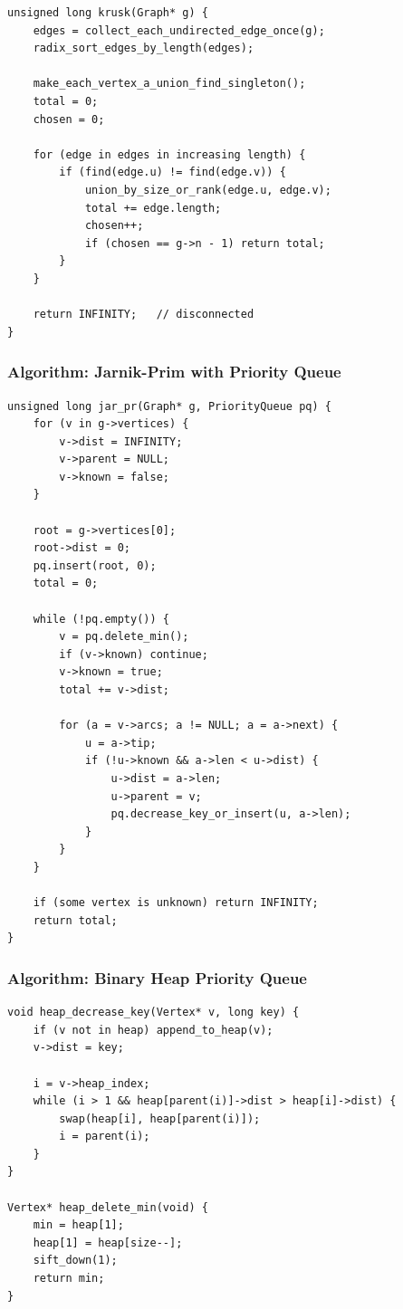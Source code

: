 \documentclass[11pt]{article}
\begin{document}
\begin{verbatim}
unsigned long krusk(Graph* g) {
    edges = collect_each_undirected_edge_once(g);
    radix_sort_edges_by_length(edges);

    make_each_vertex_a_union_find_singleton();
    total = 0;
    chosen = 0;

    for (edge in edges in increasing length) {
        if (find(edge.u) != find(edge.v)) {
            union_by_size_or_rank(edge.u, edge.v);
            total += edge.length;
            chosen++;
            if (chosen == g->n - 1) return total;
        }
    }

    return INFINITY;   // disconnected
}
\end{verbatim}

\subsubsection{Algorithm: Jarnik-Prim with Priority Queue}\label{algorithm-jarnik-prim-with-priority-queue}

\begin{verbatim}
unsigned long jar_pr(Graph* g, PriorityQueue pq) {
    for (v in g->vertices) {
        v->dist = INFINITY;
        v->parent = NULL;
        v->known = false;
    }

    root = g->vertices[0];
    root->dist = 0;
    pq.insert(root, 0);
    total = 0;

    while (!pq.empty()) {
        v = pq.delete_min();
        if (v->known) continue;
        v->known = true;
        total += v->dist;

        for (a = v->arcs; a != NULL; a = a->next) {
            u = a->tip;
            if (!u->known && a->len < u->dist) {
                u->dist = a->len;
                u->parent = v;
                pq.decrease_key_or_insert(u, a->len);
            }
        }
    }

    if (some vertex is unknown) return INFINITY;
    return total;
}
\end{verbatim}

\subsubsection{Algorithm: Binary Heap Priority Queue}\label{algorithm-binary-heap-priority-queue}

\begin{verbatim}
void heap_decrease_key(Vertex* v, long key) {
    if (v not in heap) append_to_heap(v);
    v->dist = key;

    i = v->heap_index;
    while (i > 1 && heap[parent(i)]->dist > heap[i]->dist) {
        swap(heap[i], heap[parent(i)]);
        i = parent(i);
    }
}

Vertex* heap_delete_min(void) {
    min = heap[1];
    heap[1] = heap[size--];
    sift_down(1);
    return min;
}
\end{verbatim}
\end{document}
